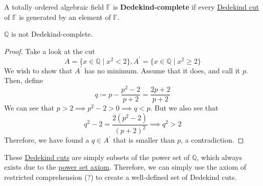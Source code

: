   \begin{definition}
    \label{def:dedekind-completeness}
    A totally ordered algebraic field $\mathbb{F}$ is \textbf{Dedekind-complete} if every \hyperref[def:dedekind-cut]{Dedekind cut} of $\mathbb{F}$ is generated by an element of $\mathbb{F}$. 
  \end{definition}

  \begin{lemma}
    \label{thm:rationals-are-not-dedekind-complete}
    $\mathbb{Q}$ is not Dedekind-complete. 
  \end{lemma}
  \begin{proof}
    Take a look at the cut
    \begin{equation}
      A = \{x \in \mathbb{Q} \mid x^2 < 2 \}, A^\prime = \{x \in \mathbb{Q} \mid x^2 \geq 2 \}
    \end{equation}
    We wish to show that $A^\prime$ has no minimum. Assume that it does, and call it $p$. Then, define 
    \begin{equation}
      q \coloneqq p - \frac{p^2 - 2}{p + 2} = \frac{2p + 2}{p + 2} 
    \end{equation}
    We can see that $p > 2 \implies p^2 - 2 > 0 \implies q < p$. But we also see that 
    \begin{equation}
      q^2 - 2 = \frac{2 (p^2 - 2)}{(p + 2)^2} \implies q^2 > 2
    \end{equation}
    Therefore, we have found a $q \in A^\prime$ that is smaller than $p$, a contradiction. 
  \end{proof}

  These \hyperref[def:dedekind-cut]{Dedekind cuts} are simply subsets of the power set of $\mathbb{Q}$, which always exists due to the \hyperref[st-power-set-axiom]{power set axiom}. Therefore, we can simply use the axiom of restricted comprehension (?) to create a well-defined set of Dedekind cuts.    

